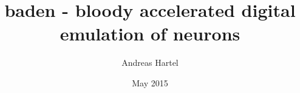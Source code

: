 \documentclass[a4paper]{report}
\begin{document}
\title{baden - bloody accelerated digital emulation of neurons}
\author{Andreas Hartel}
\date{May 2015}
\maketitle
\cleardoublepage
\tableofcontents







\end{document}
